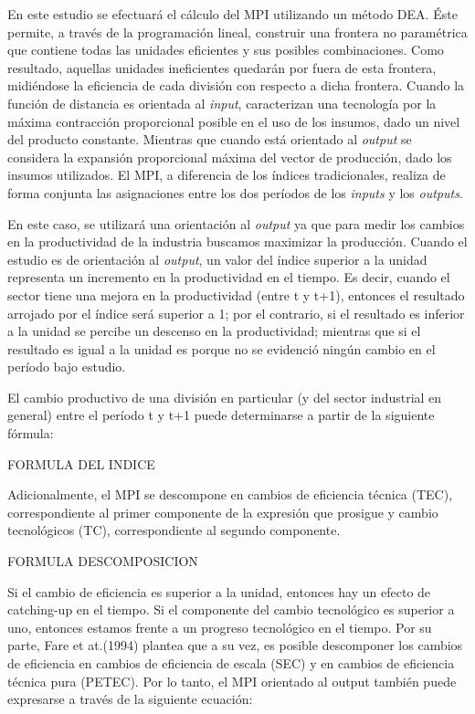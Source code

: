 \documentclass[
]{article}
\begin{document}
En este estudio se efectuará el cálculo del MPI utilizando un método
DEA. Éste permite, a través de la programación lineal, construir una
frontera no paramétrica que contiene todas las unidades eficientes y sus
posibles combinaciones. Como resultado, aquellas unidades ineficientes
quedarán por fuera de esta frontera, midiéndose la eficiencia de cada
división con respecto a dicha frontera. Cuando la función de distancia
es orientada al \emph{input}, caracterizan una tecnología por la máxima
contracción proporcional posible en el uso de los insumos, dado un nivel
del producto constante. Mientras que cuando está orientado al
\emph{output} se considera la expansión proporcional máxima del vector
de producción, dado los insumos utilizados. El MPI, a diferencia de los
índices tradicionales, realiza de forma conjunta las asignaciones entre
los dos períodos de los \emph{inputs} y los \emph{outputs}.

En este caso, se utilizará una orientación al \emph{output} ya que para
medir los cambios en la productividad de la industria buscamos maximizar
la producción. Cuando el estudio es de orientación al \emph{output}, un
valor del índice superior a la unidad representa un incremento en la
productividad en el tiempo. Es decir, cuando el sector tiene una mejora
en la productividad (entre t y t+1), entonces el resultado arrojado por
el índice será superior a 1; por el contrario, si el resultado es
inferior a la unidad se percibe un descenso en la productividad;
mientras que si el resultado es igual a la unidad es porque no se
evidenció ningún cambio en el período bajo estudio.

El cambio productivo de una división en particular (y del sector
industrial en general) entre el período t y t+1 puede determinarse a
partir de la siguiente fórmula:

FORMULA DEL INDICE

Adicionalmente, el MPI se descompone en cambios de eficiencia técnica
(TEC), correspondiente al primer componente de la expresión que prosigue
y cambio tecnológicos (TC), correspondiente al segundo componente.

FORMULA DESCOMPOSICION

Si el cambio de eficiencia es superior a la unidad, entonces hay un
efecto de catching-up en el tiempo. Si el componente del cambio
tecnológico es superior a uno, entonces estamos frente a un progreso
tecnológico en el tiempo. Por su parte, Fare et at.(1994) plantea que a
su vez, es posible descomponer los cambios de eficiencia en cambios de
eficiencia de escala (SEC) y en cambios de eficiencia técnica pura
(PETEC). Por lo tanto, el MPI orientado al output también puede
expresarse a través de la siguiente ecuación:
\end{document}
